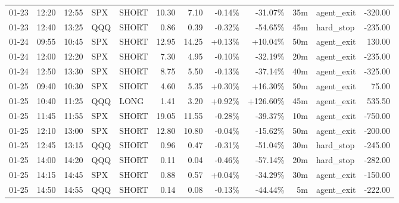 \documentclass[11pt,a4paper,twoside]{article}
\begin{document}
\begin{center}
\begin{longtable}{>{\color{txtmain}}l l l l l r r r r r >{\color{txtmain}}l r}
01-23 & 12:20 & 12:55 & SPX & SHORT & 10.30 & 7.10 & \textcolor{lossred}{-0.14\%} & \textcolor{lossred}{-31.07\%} & 35m & agent\_exit & \textcolor{lossred}{-320.00} \\
01-23 & 12:40 & 13:25 & QQQ & SHORT & 0.86 & 0.39 & \textcolor{lossred}{-0.32\%} & \textcolor{lossred}{-54.65\%} & 45m & hard\_stop & \textcolor{lossred}{-235.00} \\
01-24 & 09:55 & 10:45 & SPX & SHORT & 12.95 & 14.25 & \textcolor{wingreen}{+0.13\%} & \textcolor{wingreen}{+10.04\%} & 50m & agent\_exit & \textcolor{wingreen}{130.00} \\
01-24 & 12:00 & 12:20 & SPX & SHORT & 7.30 & 4.95 & \textcolor{lossred}{-0.10\%} & \textcolor{lossred}{-32.19\%} & 20m & agent\_exit & \textcolor{lossred}{-235.00} \\
01-24 & 12:50 & 13:30 & SPX & SHORT & 8.75 & 5.50 & \textcolor{lossred}{-0.13\%} & \textcolor{lossred}{-37.14\%} & 40m & agent\_exit & \textcolor{lossred}{-325.00} \\
01-25 & 09:40 & 10:30 & SPX & SHORT & 4.60 & 5.35 & \textcolor{wingreen}{+0.30\%} & \textcolor{wingreen}{+16.30\%} & 50m & agent\_exit & \textcolor{wingreen}{75.00} \\
01-25 & 10:40 & 11:25 & QQQ & LONG & 1.41 & 3.20 & \textcolor{wingreen}{+0.92\%} & \textcolor{wingreen}{+126.60\%} & 45m & agent\_exit & \textcolor{wingreen}{535.50} \\
01-25 & 11:45 & 11:55 & SPX & SHORT & 19.05 & 11.55 & \textcolor{lossred}{-0.28\%} & \textcolor{lossred}{-39.37\%} & 10m & agent\_exit & \textcolor{lossred}{-750.00} \\
01-25 & 12:10 & 13:00 & SPX & SHORT & 12.80 & 10.80 & \textcolor{lossred}{-0.04\%} & \textcolor{lossred}{-15.62\%} & 50m & agent\_exit & \textcolor{lossred}{-200.00} \\
01-25 & 12:45 & 13:15 & QQQ & SHORT & 0.96 & 0.47 & \textcolor{lossred}{-0.31\%} & \textcolor{lossred}{-51.04\%} & 30m & hard\_stop & \textcolor{lossred}{-245.00} \\
01-25 & 14:00 & 14:20 & QQQ & SHORT & 0.11 & 0.04 & \textcolor{lossred}{-0.46\%} & \textcolor{lossred}{-57.14\%} & 20m & hard\_stop & \textcolor{lossred}{-282.00} \\
01-25 & 14:15 & 14:45 & SPX & SHORT & 0.88 & 0.57 & \textcolor{wingreen}{+0.04\%} & \textcolor{lossred}{-34.29\%} & 30m & agent\_exit & \textcolor{lossred}{-150.00} \\
01-25 & 14:50 & 14:55 & QQQ & SHORT & 0.14 & 0.08 & \textcolor{lossred}{-0.13\%} & \textcolor{lossred}{-44.44\%} & 5m & agent\_exit & \textcolor{lossred}{-222.00} \\

\end{longtable}
\end{center}
\end{document}
